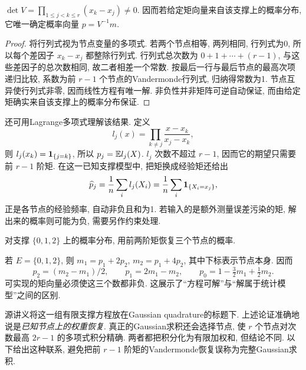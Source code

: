 \begin{proposition}[已知有限支撑的矩恢复]
$\det V=\prod_{1\le j<k\le r}(x_k-x_j)\ne0$. 因而若给定矩向量来自该支撑上的概率分布, 它唯一确定概率向量 $p=V^{-1}m$.
\end{proposition}
\begin{proof}
将行列式视为节点变量的多项式. 若两个节点相等, 两列相同, 行列式为0, 所以每个差因子 $x_k-x_j$ 都整除行列式. 行列式总次数为 $0+1+\cdots+(r-1)$, 与这些差因子的总次数相同, 故二者相差一个常数. 按最后一行与最后节点的最高次项递归比较, 系数为前 $r-1$ 个节点的Vandermonde行列式, 归纳得常数为1. 节点互异使行列式非零, 因而线性方程有唯一解. 非负性并非矩阵可逆自动保证, 而由给定矩确实来自该支撑上的概率分布保证.
\end{proof}
还可用Lagrange多项式理解该结果. 定义
\[
 l_j(x)=\prod_{k\ne j}\frac{x-x_k}{x_j-x_k},
\]
则 $l_j(x_k)=\mathbf 1_{\{j=k\}}$, 所以 $p_j=\mathbb E l_j(X)$. $l_j$ 次数不超过 $r-1$, 因而它的期望只需要前 $r-1$ 阶矩. 在这一已知支撑模型中, 把矩换成经验矩还给出
\[
 \widehat p_j=\frac1n\sum_i l_j(X_i)
 =\frac1n\sum_i\mathbf 1_{\{X_i=x_j\}},
\]
正是各节点的经验频率, 自动非负且和为1. 若输入的是额外测量误差污染的矩, 解出来的概率则可能为负, 需要另作约束处理.

\begin{example}
对支撑 $\{0,1,2\}$ 上的概率分布, 用前两阶矩恢复三个节点的概率.
\end{example}
\begin{solution}
若 $E=\{0,1,2\}$, 则 $m_1=p_1+2p_2$, $m_2=p_1+4p_2$, 其中下标表示节点本身. 因而
\[
 p_2=(m_2-m_1)/2,\qquad p_1=2m_1-m_2,\qquad
 p_0=1-\tfrac32m_1+\tfrac12m_2.
\]
可实现的矩向量必须使这三个数都非负. 这展示了“方程可解”与“解属于统计模型”之间的区别.
\end{solution}

源讲义将这一组有限支撑方程放在Gaussian quadrature的标题下. 上述论证准确地说是\emph{已知节点上的权重恢复}. 真正的Gaussian求积还会选择节点, 使 $r$ 个节点对次数最高 $2r-1$ 的多项式积分精确. 两者都把积分化为有限加权和, 但结论不同. 以下给出这种联系, 避免把前 $r-1$ 阶矩的Vandermonde恢复误称为完整Gaussian求积.

